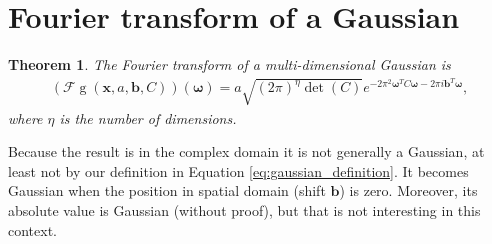 \documentclass{paper}
\newtheorem{theorem}{Theorem}
\newcommand{\F}{\ensuremath{\mathcal{F}}}
\newcommand{\vr}[1]{\ensuremath{\boldsymbol{#1}}}
\newcommand{\f}[1]{\operatorname{#1}}
\newcommand{\omegavec}[0]{\ensuremath{\vr{\omega{}}}}
\newcommand{\bvec}[0]{\ensuremath{\vr{b}}}
\begin{document}
\clearpage
\section{Fourier transform of a Gaussian}
\begin{theorem}
	The Fourier transform of a multi-dimensional Gaussian is
	\begin{align}
	\label{eq:gaussian_fourier_transform}
	(\F\f{g}(\vr{x}, a, \bvec, C))(\omegavec) = a \sqrt{(2 \pi)^\eta \f{det}(C)} e^{-2 \pi^2 \omegavec^T C \omegavec - 2\pi i \bvec^T \omegavec},
	\end{align}
	where $\eta$ is the number of dimensions.
\end{theorem}
Because the result is in the complex domain it is not generally a Gaussian, at least not by our definition in Equation \ref{eq:gaussian_definition}.
It becomes Gaussian when the position in spatial domain (shift $\bvec$) is zero.
Moreover, its absolute value is Gaussian (without proof), but that is not interesting in this context.
\end{document}
